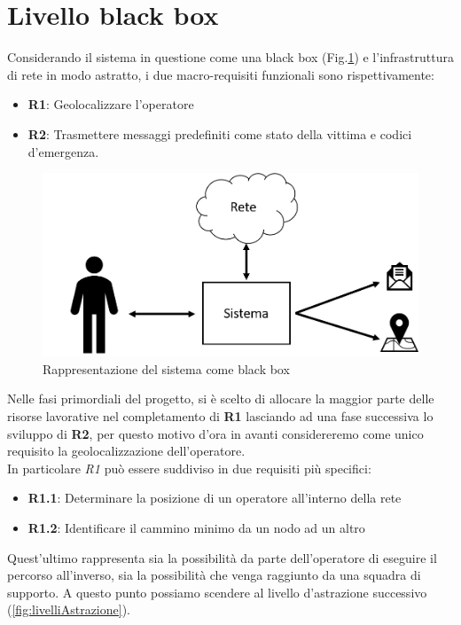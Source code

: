 \section{Livello black box}
Considerando il sistema in questione come una black box (Fig.\ref{fig:requisitiFunzionali}) e l'infrastruttura di rete in modo astratto, i due macro-requisiti funzionali  sono rispettivamente:
\begin{itemize}
	\item \textbf{R1}: Geolocalizzare l'operatore
	\item \textbf{R2}: Trasmettere messaggi predefiniti come stato della vittima e codici d'emergenza.
\end{itemize}
\begin{figure}[H]
	\centering
	\includegraphics[scale=0.3]{DescrizioneDelSistema/requisitiSistema.png}
	\caption{Rappresentazione del sistema come black box }
	\label{fig:requisitiFunzionali}
\end{figure}
Nelle fasi primordiali del progetto, si è scelto di allocare la maggior parte delle risorse lavorative nel completamento di \textbf{R1} lasciando ad una fase successiva lo sviluppo di \textbf{R2}, per questo motivo d'ora in avanti considereremo come unico requisito la geolocalizzazione dell'operatore. \\
In particolare \textit{R1} può essere suddiviso in due requisiti più specifici:
\begin{itemize}
	\item \textbf{R1.1}: Determinare la posizione di un operatore all'interno della rete
	\item \textbf{R1.2}: Identificare il cammino minimo da un nodo ad un altro
\end{itemize}
Quest'ultimo rappresenta sia la possibilità da parte dell'operatore di eseguire il percorso all'inverso, sia la possibilità che venga raggiunto da una squadra di supporto. A questo punto possiamo scendere al livello d'astrazione successivo (\ref{fig:livelliAstrazione}).
\newpage 

